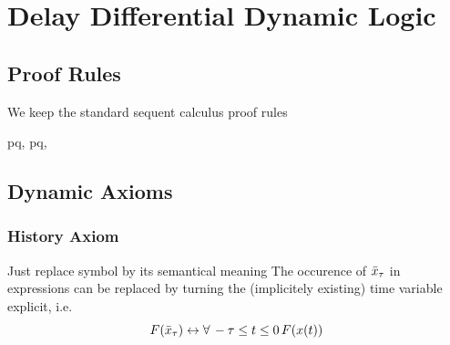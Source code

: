 \documentclass[10pt]{article}
\begin{document}

\section{Delay Differential Dynamic Logic}
    \label{sec:delay-differential-dynamic-logic}

    \subsection{Proof Rules}
        \label{sec:seq-calc-proof-rules}

        We keep the standard sequent calculus proof rules

        \begin{calculus}
           {
           {\lsequent{\Gamma} {p\land q,\Delta}}
           }{}
           {
           { {\Delta}}
           \quad
           }{}
           {
           {\lsequent{\Gamma} {p\limply q,\Delta}}
           }{}
        \end{calculus}


    \subsection{Dynamic Axioms}
        \label{sec:dynamic-axioms}

        \subsubsection{History Axiom}
            \label{history-axiom}
            Just replace symbol by its semantical meaning
            The occurence of $\bar{x}_{\tau}$ in expressions can be replaced by turning the (implicitely existing) time variable explicit, i.e.\
            \begin{equation}
                F(\bar{x}_{\tau}) \leftrightarrow \forall\,-\tau\leq t\leq 0\, F(x(t))
            \end{equation}
\end{document}
